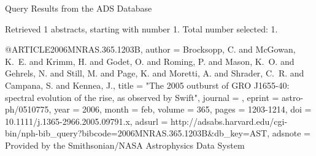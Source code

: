 Query Results from the ADS Database


Retrieved 1 abstracts, starting with number 1.  Total number selected: 1.

@ARTICLE{2006MNRAS.365.1203B,
   author = {{Brocksopp}, C. and {McGowan}, K.~E. and {Krimm}, H. and {Godet}, O. and 
	{Roming}, P. and {Mason}, K.~O. and {Gehrels}, N. and {Still}, M. and 
	{Page}, K. and {Moretti}, A. and {Shrader}, C.~R. and {Campana}, S. and 
	{Kennea}, J.},
    title = "{The 2005 outburst of GRO J1655-40: spectral evolution of the rise, as observed by Swift}",
  journal = {\mnras},
   eprint = {astro-ph/0510775},
     year = 2006,
    month = feb,
   volume = 365,
    pages = {1203-1214},
      doi = {10.1111/j.1365-2966.2005.09791.x},
   adsurl = {http://adsabs.harvard.edu/cgi-bin/nph-bib_query?bibcode=2006MNRAS.365.1203B&db_key=AST},
  adsnote = {Provided by the Smithsonian/NASA Astrophysics Data System}
}


